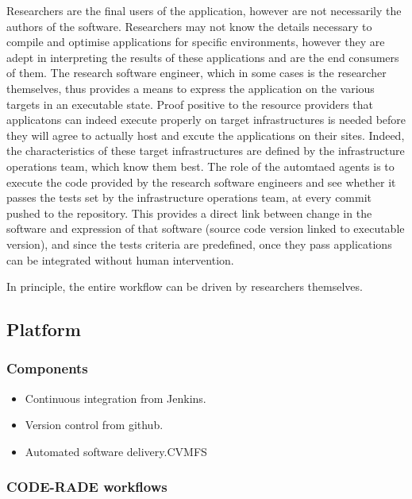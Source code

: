 \documentclass[a4paper]{jpconf}
\begin{document}
Researchers are the final users of the application, however are not necessarily the authors of the software. Researchers may not know the details necessary to compile and optimise applications for specific environments, however they are adept in interpreting the results of these applications and are the end consumers of them. The research software engineer, which in some cases is the researcher themselves, thus provides a means to express the application on the various targets in an executable state. Proof positive to the resource providers that applicatons can indeed execute properly on target infrastructures is needed before they will agree to actually host and excute the applications on their sites. Indeed, the characteristics of these target infrastructures are defined by the infrastructure operations team, which know them best. The role of the automtaed agents is to execute the code provided by the research software engineers and see whether it passes the tests set by the infrastructure operations team, at every commit pushed to the repository. This provides a direct link between change in the software and expression of that software (source code version linked to executable version), and since the tests criteria are predefined, once they pass applications can be integrated without human intervention.

In principle, the entire workflow can be driven by researchers themselves.

\subsection{Platform}



\subsubsection{Components}

\begin{itemize}
	\item Continuous integration from Jenkins.
    \item Version control from github.
    \item Automated software delivery.CVMFS
\end{itemize}

\subsubsection{CODE-RADE workflows}
\end{document}
